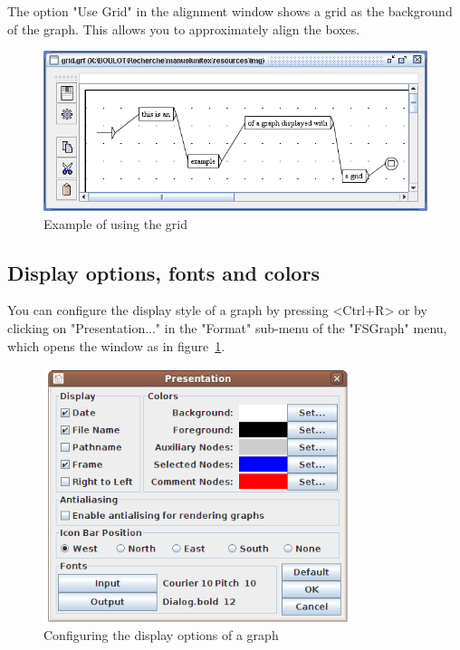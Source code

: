 \bigskip
\noindent The option "Use Grid" in the alignment window shows a grid as the
background of the graph. This allows you to approximately align the
boxes.

\bigskip
\begin{figure}[!h]
\begin{center}
\includegraphics[width=15cm]{resources/img/fig5-25.png}
\caption{Example of using the grid}
\end{center}
\end{figure}

\subsection{Display options, fonts and colors}
\label{section-display-fonts-colors}
You can configure the display style of a graph by pressing <Ctrl+R> or by
clicking on "Presentation..." in the "Format" sub-menu of the "FSGraph" menu,
which opens the window as in
figure~\ref{fig-graph-display-configuration}.

\begin{figure}[!h]
\begin{center}
\includegraphics[width=9cm]{resources/img/fig5-26.png}
\caption{Configuring the display options of a graph\label{fig-graph-display-configuration}}
\end{center}
\end{figure}

